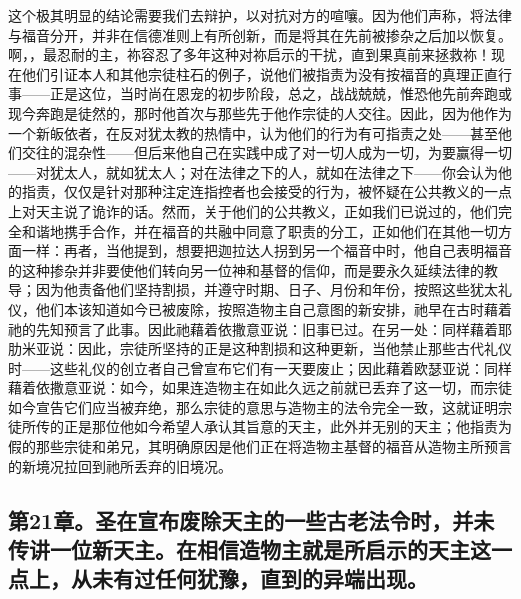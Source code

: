 这个极其明显的结论需要我们去辩护，以对抗对方的喧嚷。因为他们声称，将法律与福音分开，并非在信德准则上有所创新，而是将其在先前被掺杂之后加以恢复。啊，，最忍耐的主，祢容忍了多年这种对祢启示的干扰，直到果真前来拯救祢！现在他们引证本人和其他宗徒柱石的例子，说他们被指责为没有按福音的真理正直行事——正是这位，当时尚在恩宠的初步阶段，总之，战战兢兢，惟恐他先前奔跑或现今奔跑是徒然的，那时他首次与那些先于他作宗徒的人交往。因此，因为他作为一个新皈依者，在反对犹太教的热情中，认为他们的行为有可指责之处——甚至他们交往的混杂性——但后来他自己在实践中成了对一切人成为一切，为要赢得一切——对犹太人，就如犹太人；对在法律之下的人，就如在法律之下——你会认为他的指责，仅仅是针对那种注定连指控者也会接受的行为，被怀疑在公共教义的一点上对天主说了诡诈的话。然而，关于他们的公共教义，正如我们已说过的，他们完全和谐地携手合作，并在福音的共融中同意了职责的分工，正如他们在其他一切方面一样：再者，当他提到，想要把迦拉达人拐到另一个福音中时，他自己表明福音的这种掺杂并非要使他们转向另一位神和基督的信仰，而是要永久延续法律的教导；因为他责备他们坚持割损，并遵守时期、日子、月份和年份，按照这些犹太礼仪，他们本该知道如今已被废除，按照造物主自己意图的新安排，祂早在古时藉着祂的先知预言了此事。因此祂藉着依撒意亚说：旧事已过。在另一处：同样藉着耶肋米亚说：因此，宗徒所坚持的正是这种割损和这种更新，当他禁止那些古代礼仪时——这些礼仪的创立者自己曾宣布它们有一天要废止；因此藉着欧瑟亚说：同样藉着依撒意亚说：如今，如果连造物主在如此久远之前就已丢弃了这一切，而宗徒如今宣告它们应当被弃绝，那么宗徒的意思与造物主的法令完全一致，这就证明宗徒所传的正是那位他如今希望人承认其旨意的天主，此外并无别的天主；他指责为假的那些宗徒和弟兄，其明确原因是他们正在将造物主基督的福音从造物主所预言的新境况拉回到祂所丢弃的旧境况。\par


\subsection{第21章。圣在宣布废除天主的一些古老法令时，并未传讲一位新天主。在相信造物主就是所启示的天主这一点上，从未有过任何犹豫，直到的异端出现。}

